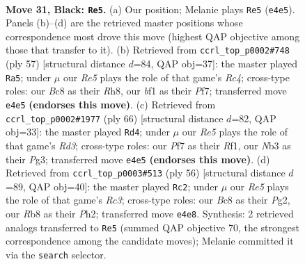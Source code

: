 \documentclass[11pt]{article}
\begin{document}
\clearpage

\begin{figure}[p]\centering
\begin{subfigure}{0.46\textwidth}\centering
\resizebox{\linewidth}{!}{%
\newchessgame
\chessboard[
  setfen={1rb3k1/p1p2pp1/3P3p/7P/p3r1n1/1nPK4/6R1/R1B2BN1 b - - 3 31},
  showmover=false,
  pgfstyle=straightmove, color=movearrow, markmove={e4-e5}
]}
\caption{}
\end{subfigure}\hfill
\begin{subfigure}{0.46\textwidth}\centering
\resizebox{\linewidth}{!}{%
\newchessgame
\chessboard[
  setfen={4k2r/1p3pp1/p2P4/2r2n1p/3P1Rn1/2N5/3K2PP/5BR1 b k - 0 29},
  showmover=false,
  pgfstyle=straightmove, color=movearrow, markmove={c5-a5}
]}
\caption{}
\end{subfigure}
\\[4pt]
\begin{subfigure}{0.46\textwidth}\centering
\resizebox{\linewidth}{!}{%
\newchessgame
\chessboard[
  setfen={1rr4k/6p1/3pb2p/1P1N4/4p2b/1B1R2PP/5P2/5RK1 w - - 0 34},
  showmover=false,
  pgfstyle=straightmove, color=movearrow, markmove={d3-d4}
]}
\caption{}
\end{subfigure}\hfill
\begin{subfigure}{0.46\textwidth}\centering
\resizebox{\linewidth}{!}{%
\newchessgame
\chessboard[
  setfen={4kbr1/B2n2pp/2N5/3bp3/1p6/1PR1NP2/1P1pK1PP/8 w - - 0 29},
  showmover=false,
  pgfstyle=straightmove, color=movearrow, markmove={c3-c2}
]}
\caption{}
\end{subfigure}
\caption{\textbf{Move 31, Black: \texttt{Re5}.} (a) Our position; Melanie plays \texttt{Re5} (\texttt{e4e5}). Panels (b)--(d) are the retrieved master positions whose correspondence most drove this move (highest QAP objective among those that transfer to it). (b) Retrieved from \texttt{ccrl\_top\_p0002\#748} (ply 57) [structural distance $d$=84, QAP obj=37]: the master played \texttt{Ra5}; under $\mu$ our \emph{Re5} plays the role of that game's \emph{Rc4}; cross-type roles: our \emph{B}c8 as their \emph{R}h8, our \emph{b}f1 as their \emph{P}f7; transferred move \texttt{e4e5} \textbf{(endorses this move)}. (c) Retrieved from \texttt{ccrl\_top\_p0002\#1977} (ply 66) [structural distance $d$=82, QAP obj=33]: the master played \texttt{Rd4}; under $\mu$ our \emph{Re5} plays the role of that game's \emph{Rd3}; cross-type roles: our \emph{P}f7 as their \emph{R}f1, our \emph{N}b3 as their \emph{P}g3; transferred move \texttt{e4e5} \textbf{(endorses this move)}. (d) Retrieved from \texttt{ccrl\_top\_p0003\#513} (ply 56) [structural distance $d$=89, QAP obj=40]: the master played \texttt{Rc2}; under $\mu$ our \emph{Re5} plays the role of that game's \emph{Rc3}; cross-type roles: our \emph{B}c8 as their \emph{P}g2, our \emph{R}b8 as their \emph{P}h2; transferred move \texttt{e4e8}. Synthesis: 2 retrieved analogs transferred to \texttt{Re5} (summed QAP objective 70, the strongest correspondence among the candidate moves); Melanie committed it via the \texttt{search} selector.}
\label{fig:thought-m61}
\end{figure}
\end{document}
